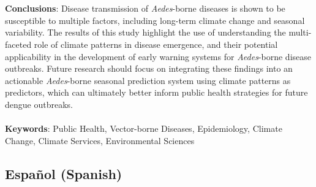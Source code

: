 \documentclass[10pt]{article}
\begin{document}
\\
\\
\textbf{Conclusions}: Disease transmission of \textit{Aedes}-borne diseases is shown to be susceptible to multiple factors, including long-term climate change and seasonal variability. The results of this study highlight the use of understanding the multi-faceted role of climate patterns in disease emergence, and their potential applicability in the development of early warning systems for \textit{Aedes}-borne disease outbreaks. Future research should focus on integrating these findings into an actionable \textit{Aedes}-borne seasonal prediction system using climate patterns as predictors, which can ultimately better inform public health strategies for future dengue outbreaks.
\\
\\
\textbf{Keywords}: Public Health, Vector-borne Diseases, Epidemiology, Climate Change, Climate Services, Environmental Sciences

\newpage

\subsection*{Español (Spanish)}
\end{document}
